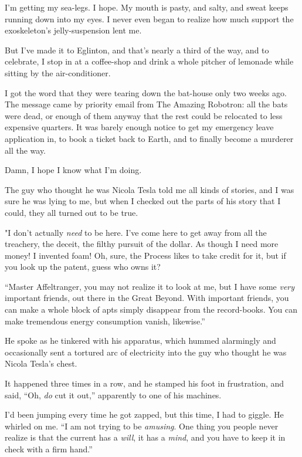 \tb

I'm getting my sea-legs. I hope. My mouth is pasty, and salty, and
sweat keeps running down into my eyes. I never even began to
realize how much support the exoskeleton's jelly-suspension lent
me.

But I've made it to Eglinton, and that's nearly a third of the way,
and to celebrate, I stop in at a coffee-shop and drink a whole
pitcher of lemonade while sitting by the air-conditioner.

I got the word that they were tearing down the bat-house only two
weeks ago. The message came by priority email from The Amazing
Robotron: all the bats were dead, or enough of them anyway that the
rest could be relocated to less expensive quarters. It was barely
enough notice to get my emergency leave application in, to book a
ticket back to Earth, and to finally become a murderer all the
way.

Damn, I hope I know what I'm doing.

\tb

The guy who thought he was Nicola Tesla told me all kinds of
stories, and I was sure he was lying to me, but when I checked out
the parts of his story that I could, they all turned out to be
true.

"I don't actually \emph{need} to be here. I've come here to get
away from all the treachery, the deceit, the filthy pursuit of the
dollar. As though I need more money! I invented foam! Oh, sure, the
Process likes to take credit for it, but if you look up the patent,
guess who owns it?

``Master Affeltranger, you may not realize it to look at me, but I have some 
\emph{very} important friends, out there in the Great Beyond. With important 
friends, you can make a whole block of apts simply disappear from the 
record-books. You can make tremendous energy consumption vanish, likewise.''

He spoke as he tinkered with his apparatus, which hummed alarmingly
and occasionally sent a tortured arc of electricity into the guy
who thought he was Nicola Tesla's chest.

It happened three times in a row, and he stamped his foot in
frustration, and said, ``Oh, \emph{do} cut it out,'' apparently to
one of his machines.

I'd been jumping every time he got zapped, but this time, I had to
giggle. He whirled on me.
``I am not trying to be \emph{amusing}. One thing you people never realize is 
that the current has a \emph{will}, it has a \emph{mind}, and you have to keep 
it in check with a firm hand.''

